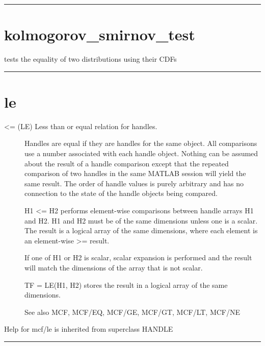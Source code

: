 \documentclass[letterpaper,10pt,english]{sphinxmanual}
\begin{document}
\bigskip\hrule{}\bigskip



\section{kolmogorov\_smirnov\_test}
\label{classes/utils/@mcf/mcf:id12}\label{classes/utils/@mcf/mcf:kolmogorov-smirnov-test}
tests the equality of two distributions using their CDFs


\bigskip\hrule{}\bigskip



\section{le}
\label{classes/utils/@mcf/mcf:id13}\label{classes/utils/@mcf/mcf:le}\begin{description}
\item[{\textless{}= (LE)   Less than or equal relation for handles.}] \leavevmode
Handles are equal if they are handles for the same object.  All
comparisons use a number associated with each handle object.  Nothing
can be assumed about the result of a handle comparison except that the
repeated comparison of two handles in the same MATLAB session will
yield the same result.  The order of handle values is purely arbitrary
and has no connection to the state of the handle objects being
compared.

H1 \textless{}= H2 performs element-wise comparisons between handle arrays H1 and
H2.  H1 and H2 must be of the same dimensions unless one is a scalar.
The result is a logical array of the same dimensions, where each
element is an element-wise \textgreater{}= result.

If one of H1 or H2 is scalar, scalar expansion is performed and the
result will match the dimensions of the array that is not scalar.

TF = LE(H1, H2) stores the result in a logical array of the same
dimensions.

See also MCF, MCF/EQ, MCF/GE, MCF/GT, MCF/LT, MCF/NE

\end{description}

Help for mcf/le is inherited from superclass HANDLE


\bigskip\hrule{}\bigskip
\end{document}
